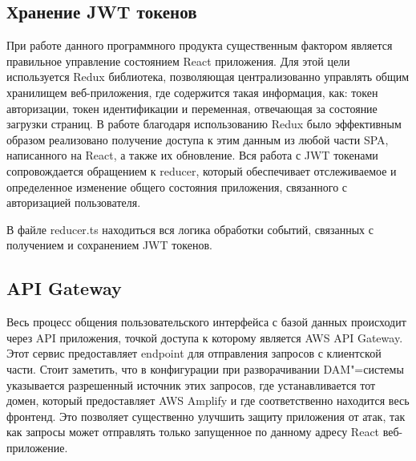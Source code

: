\subsection{Хранение JWT токенов}

При работе данного программного продукта существенным фактором является правильное управление состоянием React приложения. Для этой цели используется Redux библиотека, позволяющая централизованно управлять общим хранилищем веб-приложения, где содержится такая информация, как: токен авторизации, токен идентификации и переменная, отвечающая за состояние загрузки страниц. В работе благодаря использованию Redux было эффективным образом реализовано получение доступа к этим данным из любой части SPA, написанного на React, а также их обновление. Вся работа с JWT токенами сопровождается обращением к reducer, который обеспечивает отслеживаемое и определенное изменение общего состояния приложения, связанного с авторизацией пользователя.

В файле reducer.ts находиться вся логика обработки событий, связанных с получением и сохранением JWT токенов.

\subsection{API Gateway}

Весь процесс общения пользовательского интерфейса с базой данных происходит через API приложения, точкой доступа к которому является AWS API Gateway. Этот сервис предоставляет endpoint для отправления запросов с клиентской части. Стоит заметить, что в конфигурации при разворачивании DAM"=системы указывается разрешенный источник этих запросов, где устанавливается тот домен, который предоставляет AWS Amplify и где соответственно находится весь фронтенд. Это позволяет существенно улучшить защиту приложения от атак, так как запросы может отправлять только запущенное по данному адресу React веб-приложение.
\clearpage

